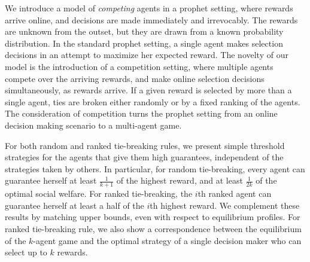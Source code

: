 We introduce a model of {\em competing} agents in a prophet setting, where rewards arrive online, and decisions are made immediately and irrevocably.
The rewards are unknown from the outset, but they are drawn from a known probability distribution.
In the standard prophet setting, a single agent makes selection decisions in an attempt to maximize her expected reward.
The novelty of our model is the introduction of a competition setting, where multiple agents compete over the arriving rewards, and make online selection decisions simultaneously, as rewards arrive.
If a given reward is selected by more than a single agent, ties are broken either randomly or by a fixed ranking of the agents. 
The consideration of competition turns the prophet setting from an online decision making scenario to a multi-agent game. 

For both random and ranked tie-breaking rules, we present simple threshold strategies for the agents that give them high guarantees, independent of the strategies taken by others. 
In particular, for random tie-breaking, every agent can guarantee herself at least $\frac{1}{k+1}$ of the highest reward, 
and at least $\frac{1}{2k}$ of the optimal social welfare. 
For ranked tie-breaking, the $i$th ranked agent can guarantee herself at least a half of the $i$th highest reward.
We complement these results by matching upper bounds, even with respect to equilibrium profiles.
For ranked tie-breaking rule, we also show a correspondence between the equilibrium of the $k$-agent game and the optimal strategy of a single decision maker who can select up to $k$ rewards.

